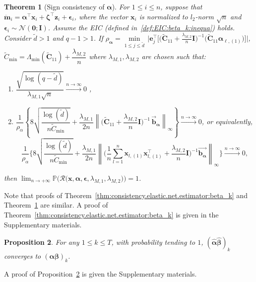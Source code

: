 \documentclass[
  12pt]{article}
\newtheorem{thm}{Theorem}[section]
\newtheorem{proposition}[thm]{Proposition}
\def\X{\mathbf{x}}
\def\Z{\mathbf{z}}
\begin{document}
\begin{thm}[Sign consistency of $\bm{\alpha}$]
\label{thm:consistency.elastic.net.estimator:alpha_l}
For $1 \leq i \leq n$, suppose that $\ddot{\mathbf{m}}_{i} =  \bm{\alpha}^{\top} \X_{i} +   \bm{\zeta}^{\top}\Z_{i} + \bm{\epsilon}_{i}$, where the vector $\X_{i}$ is normalized to $l_{2}$-norm $\sqrt{n}$ and $\bm{\epsilon}_{i} {\sim} \mathcal{N}(\bm{0} ; \mathbf{I})$. Assume the  EIC (defined  in~\eqref{def:EIC:beta_k:inequa})  holds. Consider $\widetilde{d} > 1$ and $q - 1 > 1$. If $\rho_{\bm{\alpha}} = \underset{1 \leq j \leq \widetilde{d}}{ \min } \, \Big| \mathbf{e}_{j}^{\top} \Big[   \Big( \widetilde{\mathbf{C}}_{11} + \frac{\lambda_{M,2}}{n} \mathbf{I} \Big)^{-1} \Big(\widetilde{\mathbf{C}}_{11} \bm{\alpha}_{\ell , (1)} \Big)  \Big]  \Big| $, $\widetilde{C}_{\min} = \Lambda_{\min}(\widetilde{\mathbf{C}}_{11}) + \dfrac{\lambda_{M,2}}{n}$ where $\lambda_{M,1}, \lambda_{M,2}$ are chosen such that:
\begin{enumerate}
    \item[(a)] $\displaystyle
    \dfrac{ \sqrt{ \log(q-\widetilde{d}) } }{ \lambda_{M,1}  \sqrt{n} }  \overset{n  \rightarrow \infty}{\longrightarrow}  0 $  ,
    \item[(b)] $\displaystyle   \dfrac{1}{\rho_{\alpha}} \left\{ 8 \sqrt{ \dfrac{\log(\widetilde{d})}{ n \widetilde{C}_{\min} } } +  \dfrac{\lambda_{M,1}}{2 n }  \left\| \Big( \widetilde{\mathbf{C}}_{11} + \dfrac{\lambda_{M,2}}{n} \mathbf{I} \Big)^{-1} \,  \overrightarrow{\mathbf{b}}_{\bm{\alpha}}  \right\|_{\infty}  \right\}      \overset{n   \rightarrow   \infty}{\longrightarrow}  0 $,
    or equivalently,
    \[
    \dfrac{1}{\rho_{\alpha}}  \Bigg\{ 8 \sqrt{ \dfrac{ \log(\widetilde{d})}{ n \widetilde{C}_{\min} } }  + \dfrac{\lambda_{M,1}}{2 n }  \left\|  \big( \dfrac{1}{n} \sum_{l = 1}^{n} \X_{l , (1)} \X_{l , (1)}^{\top} +  \dfrac{\lambda_{M,2}}{n} \mathbf{I} \big)^{-1}    \overrightarrow{\mathbf{b}_{\bm{\alpha}}}   \right\|_{\infty}
    \Bigg\}  \overset{n   \rightarrow   \infty}{\longrightarrow}  0  ,
    \]
\end{enumerate}
then $\lim_{n   \rightarrow   +\infty} \mathbb{P} \Big( \mathcal{R} \big( \X, \bm{\alpha}, \bm{\epsilon}, \lambda_{M,1}, \lambda_{M,2} \big) \Big) = 1$.
\end{thm}
\noindent
Note that proofs of Theorem~\ref{thm:consistency.elastic.net.estimator:beta_k} and Theorem~\ref{thm:consistency.elastic.net.estimator:alpha_l} are similar.
A proof of Theorem~\ref{thm:consistency.elastic.net.estimator:beta_k} is given in the Supplementary materials. %
\begin{proposition}
\label{thm:consistency.elastic.net.estimator:alpha.beta}
For any $1 \leq  k  \leq  T$, with probability tending to $1$, $(\widehat{\bm{\alpha}}  \widehat{\bm{\beta}})_{k}$ converges to $(\bm{\alpha} \bm{\beta})_{k}$.
\end{proposition}
\noindent
A proof of Proposition~\ref{thm:consistency.elastic.net.estimator:alpha.beta} is given the Supplementary materials.
\end{document}
